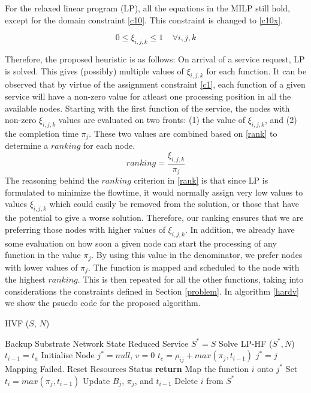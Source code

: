 \documentclass[conference]{IEEEtran}
\begin{document}
For the relaxed linear program (LP), all the equations in the MILP still hold, except for the domain constraint  \eqref{c10}. This constraint is changed to \eqref{c10x}.

\begin{equation}
0 \leq \xi_{i,j,k} \leq 1 \ \ \ \ \   \forall i, j, k
\label{c10x}
\end{equation}

Therefore, the proposed heuristic is as follows: On arrival of a service request, LP is solved. This gives (possibly) multiple values of $\xi_{i,j,k}$ for each function. It can be observed that by virtue of the assignment constraint \eqref{c1}, each function of a given service will have a non-zero value for atleast one processing position in all the available nodes. Starting with the first function of the service, the nodes with non-zero $\xi_{i,j,k}$ values are evaluated on two fronts: (1) the value of $\xi_{i,j,k}$, and (2) the completion time $\pi_j$. These two values are combined based on \eqref{rank} to determine a $ranking$ for each node.
\begin{equation}
ranking = \frac{\xi_{i,j,k}}{\pi_j}
\label{rank}
\end{equation}
The reasoning behind the $ranking$ criterion in \eqref{rank} is that since LP is formulated to minimize the flowtime, it would normally assign very low values to values $\xi_{i,j,k}$ which could easily be removed from the solution, or those that have the potential to give a worse solution. Therefore, our ranking ensures that we are preferring those nodes with higher values of $\xi_{i,j,k}$. In addition, we already have some evaluation on how soon a given node can start the processing of any function in the value $\pi_j$. By using this value in the denominator, we prefer nodes with lower values of $\pi_j$. The function is mapped and scheduled to the node with the highest $ranking$. This is then repeated for all the other functions, taking into considerations the constraints defined in Section \ref{problem}. In algorithm \ref{hardv} we show the psuedo code for the proposed algorithm.


\begin{algorithm}[t]
\caption{HVF ($S$, $N$)}
\label{hardv}
\begin{algorithmic}[1]
\STATE Backup Substrate Network State
\STATE Reduced Service $S^* = S$
\STATE Solve LP-HF ($S^*, N$)
\STATE $t_{i-1} = t_a$
\ENDIF
\STATE Initialise Node $j^* = null$, $v = 0$
\STATE $t_e = \rho_{ij} + max (\pi_{j}, t_{i-1})$
\STATE $j^* = j$
\ENDIF
\ENDFOR
\ENDFOR
{}
\STATE Mapping Failed. Reset Resources Status
\STATE \textbf{return}
\ENDIF
\STATE Map the function $i$ onto $j^*$
\STATE Set $t_i = max (\pi_{j} , t_{i-1})$
\STATE Update $B_j$, $\pi_{j}$, and $t_{i-1}$
\STATE Delete $i$ from $S^*$
\ENDFOR
\end{algorithmic}
\end{algorithm}
\end{document}
